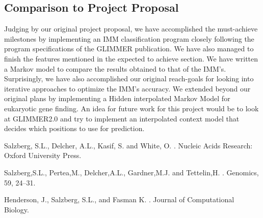 \documentclass[11pt,letterpaper]{article}
\begin{document}
\subsection{Comparison to Project Proposal}
Judging by our original project proposal, we have accomplished the must-achieve milestones by implementing an IMM classification program closely following the program specifications of the GLIMMER publication. We have also managed to finish the features mentioned in the expected to achieve section. We have written a Markov model to compare the results obtained to that of the IMM’s. Surprisingly, we have also accomplished our original reach-goals for looking into iterative approaches to optimize the IMM’s accuracy.
We extended beyond our original plans by implementing a Hidden interpolated Markov Model for eukaryotic gene finding.
An idea for future work for this project would be to look at GLIMMER2.0 and try to implement an interpolated context model that decides which positions to use for prediction.


\begin{thebibliography}{}

Salzberg, S.L., Delcher, A.L., Kasif, S. and White, O.
.
\newblock Nucleic Acids Research: Oxford University Press.

Salzberg,S.L., Pertea,M., Delcher,A.L., Gardner,M.J. and
Tettelin,H.
.
\newblock Genomics, 59, 24–31.

Henderson, J., Salzberg, S.L., and Fasman K.
.
\newblock Journal of Computational Biology.

\end{thebibliography}
\end{document}
